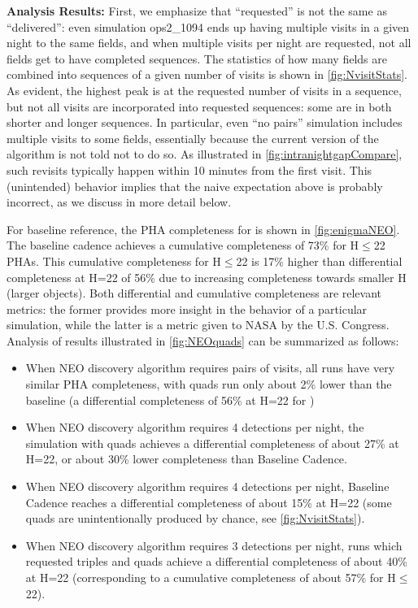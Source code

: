 {\bf Analysis Results:}
First, we emphasize that ``requested'' is not the same as ``delivered'': even simulation
ops2\_1094 ends up having multiple visits in a given night to the same fields, and when
multiple visits per night are requested, not all fields get to have completed sequences.
The statistics of how many fields are combined into sequences of a given number of
visits is shown in \autoref{fig:NvisitStats}.  As evident, the highest peak is at the
requested number of visits in a sequence, but not all visits are incorporated into
requested sequences: some are in both shorter and longer sequences. In particular,
even ``no pairs'' simulation includes multiple visits to some fields, essentially because
the current version of the algorithm is not told not to do so. As illustrated in
\autoref{fig:intranightgapCompare}, such revisits typically happen within 10 minutes
from the first visit. This (unintended) behavior implies that the naive expectation above
is probably incorrect, as we discuss in more detail below.



For baseline reference, the PHA completeness for  is shown in \autoref{fig:enigmaNEO}.
The baseline cadence achieves a cumulative completeness of 73\% for H$\le$22 PHAs. This
cumulative completeness for H$\le$22 is 17\% higher than differential completeness at H=22
of 56\% due to increasing completeness towards smaller H (larger objects). Both differential
and cumulative completeness are relevant metrics: the former provides more insight in the
behavior of a particular simulation, while the latter is a metric given to NASA by the U.S. Congress.
Analysis of results illustrated in \autoref{fig:NEOquads} can be summarized as follows:
\begin{itemize}
\item When NEO discovery algorithm requires pairs of visits, all runs have very similar PHA
completeness, with quads run only about 2\% lower than the baseline (a differential completeness
of 56\% at H=22 for )
\item When NEO discovery algorithm requires 4 detections per night, the simulation with
quads achieves a differential completeness of about 27\% at H=22, or  about 30\% lower
completeness than Baseline Cadence.
\item When NEO discovery algorithm requires 4 detections per night, Baseline Cadence
reaches a differential completeness of about 15\% at H=22 (some quads are unintentionally
produced by chance, see \autoref{fig:NvisitStats}).
\item When NEO discovery algorithm requires 3 detections per night,  runs which requested
triples and quads achieve a differential completeness of about 40\% at H=22 (corresponding
to a cumulative completeness of about 57\% for H$\le$22).
\end{itemize}

